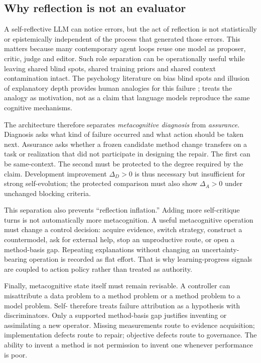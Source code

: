 \subsection{Why reflection is not an evaluator}

A self-reflective LLM can notice errors, but the act of reflection is not statistically or epistemically independent of the process that generated those errors. This matters because many contemporary agent loops reuse one model as proposer, critic, judge and editor. Such role separation can be operationally useful while leaving shared blind spots, shared training priors and shared context contamination intact. The psychology literature on bias blind spots and illusion of explanatory depth provides human analogies for this failure \cite{pronin2002,rozenblit2002}; \RAKL{} treats the analogy as motivation, not as a claim that language models reproduce the same cognitive mechanisms.

The architecture therefore separates \emph{metacognitive diagnosis} from \emph{assurance}. Diagnosis asks what kind of failure occurred and what action should be taken next. Assurance asks whether a frozen candidate method change transfers on a task or realization that did not participate in designing the repair. The first can be same-context. The second must be protected to the degree required by the claim. Development improvement \(\Delta_D>0\) is thus necessary but insufficient for strong self-evolution; the protected comparison must also show \(\Delta_A>0\) under unchanged blocking criteria.

This separation also prevents ``reflection inflation.'' Adding more self-critique turns is not automatically more metacognition. A useful metacognitive operation must change a control decision: acquire evidence, switch strategy, construct a countermodel, ask for external help, stop an unproductive route, or open a method-basis gap. Repeating explanations without changing an uncertainty-bearing operation is recorded as flat effort. That is why learning-progress signals are coupled to action policy rather than treated as authority.

Finally, metacognitive state itself must remain revisable. A controller can misattribute a data problem to a method problem or a method problem to a model problem. Self-\RAKL{} therefore treats failure attribution as a hypothesis with discriminators. Only a supported method-basis gap justifies inventing or assimilating a new operator. Missing measurements route to evidence acquisition; implementation defects route to repair; objective defects route to governance. The ability to invent a method is not permission to invent one whenever performance is poor.

